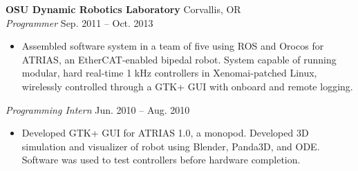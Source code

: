 \documentclass[10pt,letterpaper,margin]{res}
\begin{document}
\begin{resume}
{\bf OSU Dynamic Robotics Laboratory} \hfill {\color{lightgray} Corvallis, OR} \\
{\it Programmer} \hfill {\color{lightgray} Sep. 2011 -- Oct. 2013}\vspace{0.2em}

\begin{itemize}
	\item Assembled software system in a team of five using ROS and Orocos for
		ATRIAS, an EtherCAT-enabled bipedal robot. System capable of running
		modular, hard real-time 1 kHz controllers in Xenomai-patched Linux,
		wirelessly controlled through a GTK+ GUI with onboard and remote
		logging.


\end{itemize}

{\it Programming Intern} \hfill {\color{lightgray} Jun. 2010 -- Aug. 2010}\vspace{0.2em}

\begin{itemize}
	\item Developed GTK+ GUI for ATRIAS 1.0, a monopod. Developed 3D simulation
		and visualizer of robot using Blender, Panda3D, and ODE. Software was
		used to test controllers before hardware completion.
\end{itemize}




\end{resume}
\end{document}
